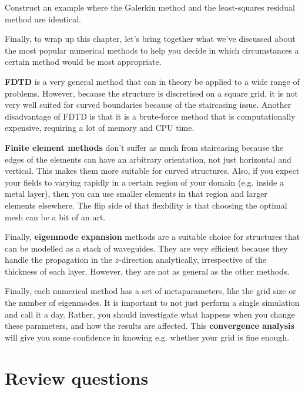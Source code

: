 \begin{exer}
Construct an example where the Galerkin method and the least-squares residual method are identical.
\end{exer}

\pagebreak



Finally, to wrap up this chapter, let's bring together what we've discussed about the most popular numerical methods to help you decide in which circumstances a certain method would be most appropriate.

\textbf{FDTD} is a very general method that can in theory be applied to a wide range of problems. However, because the structure is discretised on a square grid, it is not very well suited for curved boundaries because of the staircasing issue.  Another disadvantage of FDTD is that it is a brute-force method that is computationally expensive, requiring a lot of memory and CPU time.

\textbf{Finite element methods} don't suffer as much from staircasing because the edges of the elements can have an arbitrary orientation, not just horizontal and vertical. This makes them more suitable for curved structures. Also, if you expect your fields to varying rapidly in a certain region of your domain (e.g. inside a metal layer), then you can use smaller elements in that region and larger elements elsewhere. The flip side of that flexbility is that choosing the optimal mesh can be a bit of an art.

Finally, \textbf{eigenmode expansion} methods are a suitable choice for structures that can be modelled as a stack of waveguides. They are very efficient because they handle the propagation in the $z$-direction analytically, irrespective of the thickness of each layer. However, they are not as general as the other methods.

Finally, each numerical method has a set of metaparameters, like the grid size or the number of eigenmodes. It is important to not just perform a single simulation and call it a day. Rather, you should investigate what happens when you change these parameters, and how the results are affected. This \textbf{convergence analysis} will give you some confidence in knowing e.g. whether your grid is fine enough.

\pagebreak

\section*{Review questions}

